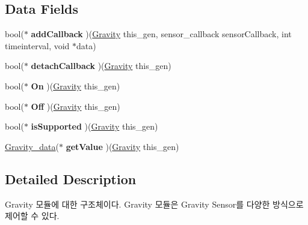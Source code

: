 \subsection*{Data Fields}
\begin{DoxyCompactItemize}
\item 
\hypertarget{struct__Gravity_a97d8eda6cd87e136819bd2fbc3129b2c}{bool($\ast$ {\bfseries add\-Callback} )(\hyperlink{struct__Gravity}{Gravity} this\-\_\-gen, sensor\-\_\-callback sensor\-Callback, int timeinterval, void $\ast$data)}\label{struct__Gravity_a97d8eda6cd87e136819bd2fbc3129b2c}

\item 
\hypertarget{struct__Gravity_a9b93ec94fcb5c3b25d401e10bb3d2cbc}{bool($\ast$ {\bfseries detach\-Callback} )(\hyperlink{struct__Gravity}{Gravity} this\-\_\-gen)}\label{struct__Gravity_a9b93ec94fcb5c3b25d401e10bb3d2cbc}

\item 
\hypertarget{struct__Gravity_ac230a6743c97ec08801bb6f76411868d}{bool($\ast$ {\bfseries On} )(\hyperlink{struct__Gravity}{Gravity} this\-\_\-gen)}\label{struct__Gravity_ac230a6743c97ec08801bb6f76411868d}

\item 
\hypertarget{struct__Gravity_acf0892b7f4e2860b1916f433f644ab1e}{bool($\ast$ {\bfseries Off} )(\hyperlink{struct__Gravity}{Gravity} this\-\_\-gen)}\label{struct__Gravity_acf0892b7f4e2860b1916f433f644ab1e}

\item 
\hypertarget{struct__Gravity_a64d7cabe8a37fd627a0fa93af3372ec6}{bool($\ast$ {\bfseries is\-Supported} )(\hyperlink{struct__Gravity}{Gravity} this\-\_\-gen)}\label{struct__Gravity_a64d7cabe8a37fd627a0fa93af3372ec6}

\item 
\hypertarget{struct__Gravity_afe837cce5c4d493eb3b48a65261d000d}{\hyperlink{Sensor_8h_df/d29/struct__3d__data}{Gravity\-\_\-data}($\ast$ {\bfseries get\-Value} )(\hyperlink{struct__Gravity}{Gravity} this\-\_\-gen)}\label{struct__Gravity_afe837cce5c4d493eb3b48a65261d000d}

\end{DoxyCompactItemize}


\subsection{Detailed Description}
Gravity 모듈에 대한 구조체이다. Gravity 모듈은 Gravity Sensor를 다양한 방식으로 제어할 수 있다. 

